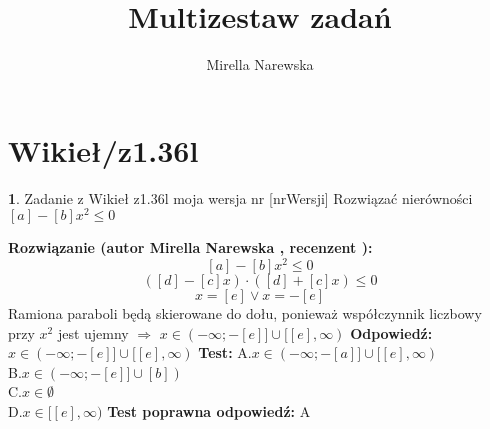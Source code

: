 \documentclass[12pt, a4paper]{article}
\title{Multizestaw zadań}
\author{Mirella Narewska}
\date{}
\theoremstyle{definition} %
\newtheorem{zad}{}
\newcommand{\kategoria}[1]{\section{#1}} %
\newcommand{\zadStart}[1]{\begin{zad}#1\newline} %
\newcommand{\zadStop}{\end{zad}}   %
\newcommand{\rozwStart}[2]{\noindent \textbf{Rozwiązanie (autor #1 , recenzent #2): }\newline} %
\newcommand{\rozwStop}{\newline}                                            %
\newcommand{\odpStart}{\noindent \textbf{Odpowiedź:}\newline}    %
\newcommand{\odpStop}{\newline}                                             %
\newcommand{\testStart}{\noindent \textbf{Test:}\newline} %
\newcommand{\testStop}{\newline} %
\newcommand{\kluczStart}{\noindent \textbf{Test poprawna odpowiedź:}\newline} %
\newcommand{\kluczStop}{\newline} %
\begin{document}
\maketitle


\kategoria{Wikieł/z1.36l}
\zadStart{Zadanie z Wikieł z1.36l moja wersja nr [nrWersji]}
 Rozwiązać nierówności $[a]-[b]x^2\leq 0$
\zadStop
\rozwStart{Mirella Narewska}{}
$$[a]-[b]x^2\leq 0 $$
$$([d]-[c]x)\cdot ([d]+[c]x) \leq 0$$
$$x=[e] \vee x=-[e]$$
Ramiona paraboli będą skierowane do dołu, ponieważ współczynnik liczbowy przy $x^2$ jest ujemny  $\Rightarrow$ $x \in (-\infty; -[e]] \cup [[e], \infty)$
\rozwStop
\odpStart
$x \in (-\infty; -[e]] \cup [[e], \infty)$
\odpStop
\testStart
A.$x \in (-\infty; -[a]] \cup [[e], \infty)$
\\
B.$x \in (-\infty; -[e]] \cup [b])$
\\
C.$x \in \emptyset $
\\
D.$x \in  [[e], \infty)$
\testStop
\kluczStart
A
\kluczStop
\end{document}
